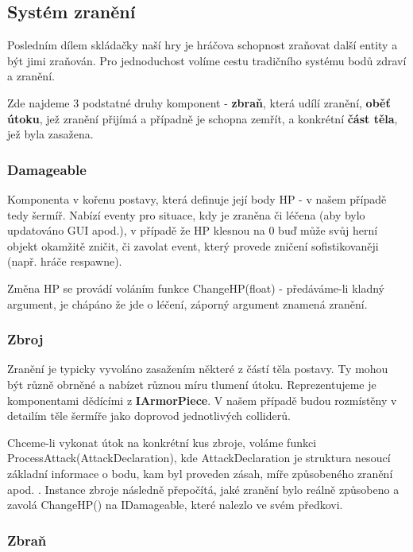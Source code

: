 \subsection{Systém zranění}

Posledním dílem skládačky naší hry je hráčova schopnost zraňovat další entity a být jimi zraňován. Pro jednoduchost volíme cestu tradičního systému bodů zdraví a zranění.

Zde najdeme 3 podstatné druhy komponent - \textbf{zbraň}, která udílí zranění, \textbf{oběť útoku}, jež zranění přijímá a případně je schopna zemřít, a konkrétní \textbf{část těla}, jež byla zasažena.

\subsubsection*{Damageable}

Komponenta v kořenu postavy, která definuje její body HP - v našem případě tedy šermíř. Nabízí eventy pro situace, kdy je zraněna či léčena (aby bylo updatováno GUI apod.), v případě že HP klesnou na 0 buď může svůj herní objekt okamžitě zničit, či zavolat event, který provede zničení sofistikovaněji (např. hráče respawne). 

Změna HP se provádí voláním funkce ChangeHP(float) - předáváme-li kladný argument, je chápáno že jde o léčení, záporný argument znamená zranění.

\subsubsection*{Zbroj}

Zranění je typicky vyvoláno zasažením některé z částí těla postavy. Ty mohou být různě obrněné a nabízet různou míru tlumení útoku. Reprezentujeme je komponentami dědícími z \textbf{IArmorPiece}. V našem případě budou rozmístěny v detailím těle šermíře jako doprovod jednotlivých colliderů.

Chceme-li vykonat útok na konkrétní kus zbroje, voláme funkci ProcessAttack(AttackDeclaration), kde AttackDeclaration je struktura nesoucí základní informace o bodu, kam byl proveden zásah, míře způsobeného zranění apod. . Instance zbroje následně přepočítá, jaké zranění bylo reálně způsobeno a zavolá ChangeHP() na IDamageable, které nalezlo ve svém předkovi.

\subsubsection*{Zbraň}

